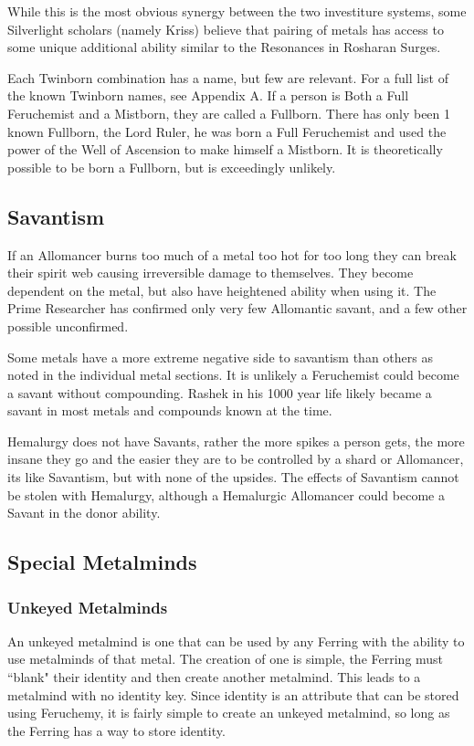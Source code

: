 \documentclass[conference]{IEEEtran}
\begin{document}
While this is the most obvious synergy between the two investiture systems, some Silverlight scholars (namely Kriss) believe that pairing of metals has access to some unique additional ability similar to the Resonances in Rosharan Surges.\cite{ARS}

Each Twinborn combination has a name, but few are relevant.  For a full list of the known Twinborn names, see Appendix A.\cite{MBARPG}
If a person is Both a Full Feruchemist and a Mistborn, they are called a Fullborn.\cite{fullborn}  There has only been 1 known Fullborn, the Lord Ruler, he was born a Full Feruchemist\cite{TFE-EP} and used the power of the Well of Ascension to make himself a Mistborn.\cite{well-mistborn} 
It is theoretically possible to be born a Fullborn, but is exceedingly  unlikely.\cite{bornfull}

\subsection*{Savantism}
If an Allomancer burns too much of a metal too hot for too long they can break their spirit web causing irreversible damage to themselves.\cite{WoF}  They become dependent on the metal, but also have heightened ability when using it.\cite{HoA-EP}  The Prime Researcher has confirmed only very few Allomantic savant, and a few other possible unconfirmed.

Some metals have a more extreme negative side to savantism than others as noted in the individual metal sections.
It is unlikely a Feruchemist could become a savant without compounding.\cite{miles-savant}  Rashek in his 1000 year life likely became a savant in most metals and compounds known at the time.\cite{lr-savant-al}

Hemalurgy does not have Savants, rather the more spikes a person gets, the more insane they go and the easier they are to be controlled by a shard or Allomancer, its like Savantism, but with none of the upsides.\cite{WoA-CH47}   The effects of Savantism cannot be stolen with Hemalurgy,\cite{savant-no-steal} although a Hemalurgic Allomancer could become a Savant in the donor ability.\cite{HE-savant}

\subsection*{Special Metalminds}
\subsubsection*{Unkeyed Metalminds}\hfill\break
An unkeyed metalmind is one that can be used by any Ferring with the ability to use metalminds of that metal.\cite{BoM-CH3}  The creation of one is simple, the Ferring must ``blank" their identity and then create another metalmind.  This leads to a metalmind with no identity key.  Since identity is an attribute that can be stored using Feruchemy, it is fairly simple to create an unkeyed metalmind, so long as the Ferring has a way to store identity.\cite{BoM-CH3}
\hfill\break
\end{document}
